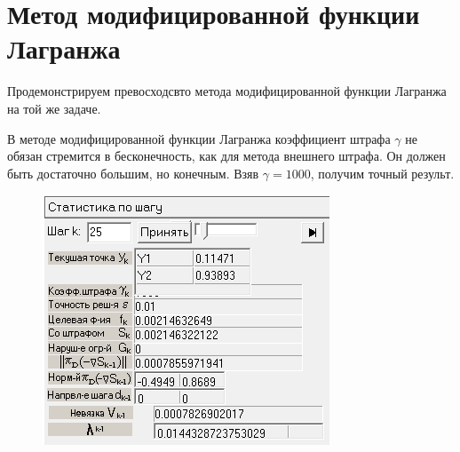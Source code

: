 \section{Метод модифицированной функции Лагранжа}
Продемонстрируем превосходсвто метода модифицированной функции Лагранжа на той же задаче.

В методе модифицированной функции Лагранжа коэффициент штрафа $\gamma$ не обязан стремится в бесконечность, как для метода внешнего штрафа. Он должен быть достаточно большим, но конечным. Взяв $\gamma = 1000$, получим точный результ.
\begin{figure}[H]
    \centering
    \includegraphics{lagranz.png}
\end{figure}


